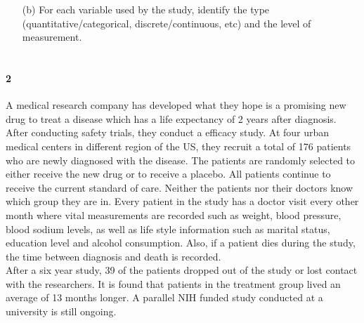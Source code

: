 \documentclass{article}
\begin{document}
\begin{flushleft}
\begin{itemize}
\item[(b)] For each variable used by the study, identify the type (quantitative/categorical, discrete/continuous, etc) and the level of measurement.\\
\medskip
{}\\
\end{itemize}



\newpage
\paragraph{2} A medical research company has developed what they hope is a promising new drug to treat a disease which has a life expectancy of 2 years after diagnosis. After conducting safety trials, they conduct a efficacy study. At four urban medical centers in different region of the US, they recruit a total of 176 patients who are newly diagnosed with the disease. The patients are randomly selected to either receive the new drug or to receive a placebo. All patients continue to receive the current standard of care. Neither the patients nor their doctors know which group they are in. Every patient in the study has a doctor visit every other month where vital measurements are recorded such as weight, blood pressure, blood sodium levels, as well as life style information such as marital status, education level and alcohol consumption. Also, if a patient dies during the study, the time between diagnosis and death is recorded.\\
\medskip
After a six year study, 39 of the patients dropped out of the study or lost contact with the researchers. It is found that patients in the treatment group lived an average of 13 months longer. A parallel NIH funded study conducted at a university is still ongoing.


\end{flushleft}
\end{document}
